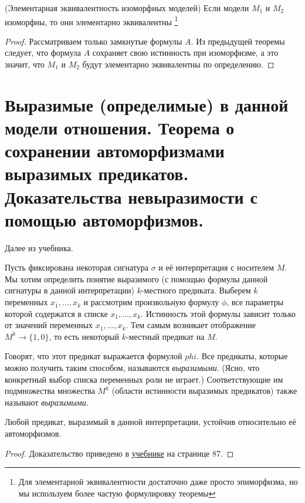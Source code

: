 \documentclass{article}
\begin{document}
\begin{theorem}{(Элементарная эквивалентность изоморфных моделей)}
	Если модели \(M_1\) и \(M_2\) изоморфны, то они элементарно эквивалентны \footnote{Для элементарной эквивалентности достаточно даже просто эпиморфизма, но мы используем более частую формулировку теоремы}
\end{theorem}

\begin{proof}
    Рассматриваем только замкнутые формулы \(A\). Из предыдущей теоремы следует, что формула \(A\) сохраняет свою истинность при изоморфизме, а это значит, что \(M_1\) и \(M_2\) будут элементарно эквивалентны по определению.
\end{proof}

\setcounter{section}{23}

\section{Выразимые (определимые) в данной модели отношения. Теорема о сохранении автоморфизмами выразимых предикатов. Доказательства невыразимости с помощью автоморфизмов.}

Далее из учебника.

Пусть фиксирована некоторая сигнатура \(\sigma\) и её интерпретация с носителем \(M\). Мы хотим определить понятие выразимого (с помощью формулы данной сигнатуры в данной интерпретации) \(k\)-местного предиката.
Выберем \(k\) переменных \(x_1, \dots, x_k\) и рассмотрим произвольную формулу \(\phi\), все параметры которой содержатся в списке \(x_1, \dots, x_k\). Истинность этой формулы зависит только от значений переменных \(x_1, \dots, x_k\). Тем самым возникает отображение \(M^k \rightarrow \{1, 0\}\), то есть некоторый \(k\)-местный предикат на \(M\).

Говорят, что этот предикат выражается формулой \(phi\). Все предикаты, которые можно получить таким способом, называются \textit{выразимыми}. (Ясно, что конкретный выбор списка переменных роли не играет.) Соответствующие им подмножества множества \(M^k\) (области истинности выразимых предикатов) также называют \textit{выразимыми}.


\begin{theorem}
	Любой предикат, выразимый в данной интерпретации, устойчив относительно её автоморфизмов.
\end{theorem}

\begin{proof}
	Доказательство приведено в \href{https://www.mccme.ru/free-books/shen/shen-logic-part2-2.pdf}{учебнике} на странице 87.
\end{proof}
\end{document}
